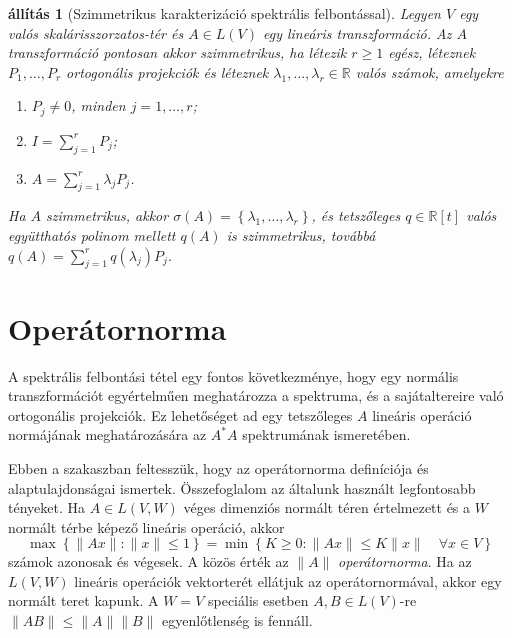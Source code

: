 \documentclass[9pt, a4paper, showtrims]{memoir}
\theoremstyle{plain}
\newtheorem{proposition}{állítás}[chapter]
\theoremstyle{remark}
\theoremstyle{definition}
\begin{document}
\begin{proposition}[Szimmetrikus karakterizáció spektrális felbontással]
	Legyen $V$ egy valós ska\-lá\-ris\-szor\-za\-tos-tér
	és $A\in L\left( V \right)$ egy lineáris transzformáció.
	Az $A$ transzformáció pontosan akkor szimmetrikus,
	ha létezik $r\geq 1$ egész, léteznek $P_1,\ldots,P_r$ ortogonális projekciók és
	léteznek $\lambda_1,\ldots,\lambda_r\in\mathbb{R}$ valós számok,
	amelyekre
	\begin{enumerate}
		\item $P_j\neq 0$, minden $j=1,\ldots,r$;
		\item $I=\sum_{j=1}^rP_j$;
		\item $A=\sum_{j=1}^r\lambda_jP_j$.
	\end{enumerate}
	Ha $A$ szimmetrikus,
	akkor $\sigma\left( A \right)=\left\{ \lambda_1,\ldots,\lambda_r \right\}$,
	és tetszőleges $q\in\mathbb{R}[t]$ valós együtthatós polinom mellett
	$q\left( A \right)$ is szimmetrikus,
	továbbá
	$q\left( A \right)=\sum_{j=1}^rq\left( \lambda_j \right)P_j$.
\end{proposition}




\section{Operátornorma}
A spektrális felbontási tétel egy fontos következménye,
hogy egy normális transzformációt egyértelműen meghatározza a spektruma, és a sajátaltereire való
ortogonális projekciók.
Ez lehetőséget ad egy tetszőleges $A$ lineáris operáció normájának meghatározására az $A^\ast A$ spektrumának ismeretében.

Ebben a szakaszban feltesszük,
hogy az operátornorma definíciója és alaptulajdonságai ismertek.
Összefoglalom az általunk használt legfontosabb tényeket.
Ha $A\in L\left( V,W \right)$ véges dimenziós normált téren értelmezett és a $W$ normált térbe képező lineáris operáció,
akkor
\[
	\max\left\{ \|Ax\|:\|x\|\leq 1 \right\}
	=
	\min\left\{ K\geq 0:\|Ax\|\leq K\|x\|\quad\forall x\in V \right\}
\]
számok azonosak és végesek. A közös érték az $\|A\|$ \emph{operátornorma}.
Ha az $L\left( V,W \right)$ lineáris operációk vektorterét ellátjuk az operátornormával,
akkor egy normált teret kapunk.
A $W=V$ speciális esetben $A,B\in L\left( V \right)$-re $\|AB\|\leq \|A\|\|B\|$ egyenlőtlenség is fennáll.
\end{document}

